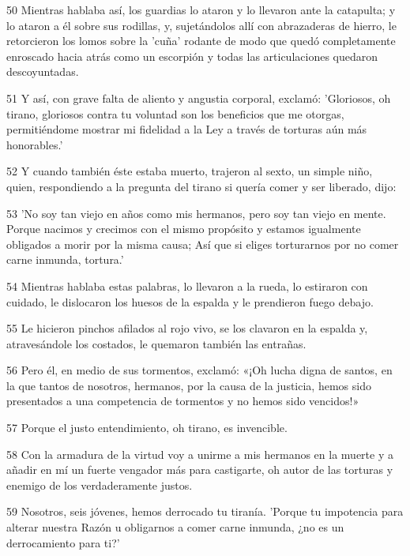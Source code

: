 \par 50 Mientras hablaba así, los guardias lo ataron y lo llevaron ante la catapulta; y lo ataron a él sobre sus rodillas, y, sujetándolos allí con abrazaderas de hierro, le retorcieron los lomos sobre la 'cuña' rodante de modo que quedó completamente enroscado hacia atrás como un escorpión y todas las articulaciones quedaron descoyuntadas.

\par 51 Y así, con grave falta de aliento y angustia corporal, exclamó: 'Gloriosos, oh tirano, gloriosos contra tu voluntad son los beneficios que me otorgas, permitiéndome mostrar mi fidelidad a la Ley a través de torturas aún más honorables.'

\par 52 Y cuando también éste estaba muerto, trajeron al sexto, un simple niño, quien, respondiendo a la pregunta del tirano si quería comer y ser liberado, dijo:

\par 53 'No soy tan viejo en años como mis hermanos, pero soy tan viejo en mente. Porque nacimos y crecimos con el mismo propósito y estamos igualmente obligados a morir por la misma causa; Así que si eliges torturarnos por no comer carne inmunda, tortura.'

\par 54 Mientras hablaba estas palabras, lo llevaron a la rueda, lo estiraron con cuidado, le dislocaron los huesos de la espalda y le prendieron fuego debajo.

\par 55 Le hicieron pinchos afilados al rojo vivo, se los clavaron en la espalda y, atravesándole los costados, le quemaron también las entrañas.

\par 56 Pero él, en medio de sus tormentos, exclamó: «¡Oh lucha digna de santos, en la que tantos de nosotros, hermanos, por la causa de la justicia, hemos sido presentados a una competencia de tormentos y no hemos sido vencidos!»

\par 57 Porque el justo entendimiento, oh tirano, es invencible.

\par 58 Con la armadura de la virtud voy a unirme a mis hermanos en la muerte y a añadir en mí un fuerte vengador más para castigarte, oh autor de las torturas y enemigo de los verdaderamente justos.

\par 59 Nosotros, seis jóvenes, hemos derrocado tu tiranía. 'Porque tu impotencia para alterar nuestra Razón u obligarnos a comer carne inmunda, ¿no es un derrocamiento para ti?'

